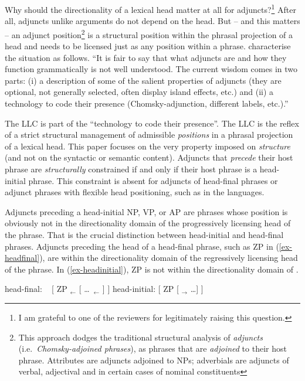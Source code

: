 \documentclass[output=paper
  ,nobabel
  ,uniformtopskip %
]{langscibook}
\begin{document}
Why should the directionality of a lexical head matter at all for adjuncts?\footnote{I am grateful to one of the reviewers for legitimately raising this question.}  After all, adjuncts unlike arguments do not depend on the head. But – and this matters – an adjunct position\footnote{This approach dodges the traditional structural analysis of \emph{adjuncts} (i.e.\ \emph{Chomsky-adjoined phrases}), as phrases that are \emph{adjoined} to their host phrase. Attributes are adjuncts adjoined to NPs; adverbials are adjuncts of verbal, adjectival and in certain cases of nominal constituents}  is a structural position within the phrasal projection of a head and needs to be licensed just as any position within a phrase. \citet*[57]{HornsteinNunes2008} characterise the situation as follows. ``It is fair to say that what adjuncts are and how they function grammatically is not well understood. The current wisdom comes in two parts: (i) a description of some of the salient properties of adjuncts (they are optional, not generally selected, often display island effects, etc.) and (ii) a technology to code their presence (Chomsky-adjunction, different labels, etc.).''

The LLC is part of the ``technology to code their presence''. The LLC is the reflex of a strict structural management of admissible \emph{positions} in a phrasal projection of a lexical head. This paper focuses on the very property imposed on \emph{structure} (and not on the syntactic or semantic content). Adjuncts that \emph{precede} their host phrase are \emph{structurally} constrained if and only if their host phrase is a head-initial phrase. This constraint is absent for adjuncts of head-final phrases or adjunct phrases with flexible head positioning, such as in the  languages.

Adjuncts preceding a head-initial NP, VP, or AP are phrases whose position is obviously not in the directionality domain of the progressively licensing head of the phrase. That is the crucial distinction between head-initial and head-final phrases. Adjuncts preceding the head of a head-final phrase, such as ZP in (\ref{ex-headfinal}), are within the directionality domain of the regressively licensing head of the phrase. In (\ref{ex-headinitial}), ZP is not within the directionality domain of \xzero.

\eal
\ex\label{ex-headfinal}  head-final: ~ [ ZP $_\leftarrow$ [ \ldots\ $_\leftarrow$ \xzero] ]
\ex\label{ex-headinitial} head-initial:	[ ZP [ \xzero $_\rightarrow$ \ldots ] ]
\zl
\end{document}
